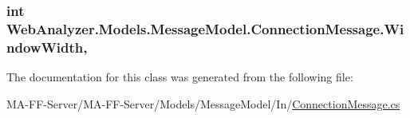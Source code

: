 \subsubsection[{Window\+Width}]{\setlength{\rightskip}{0pt plus 5cm}int Web\+Analyzer.\+Models.\+Message\+Model.\+Connection\+Message.\+Window\+Width\hspace{0.3cm}{\ttfamily [get]}, {\ttfamily [set]}}\label{class_web_analyzer_1_1_models_1_1_message_model_1_1_connection_message_ad41b2edd499a0085aefa4ab180de9dc7}


The documentation for this class was generated from the following file\+:\begin{DoxyCompactItemize}
\item 
M\+A-\/\+F\+F-\/\+Server/\+M\+A-\/\+F\+F-\/\+Server/\+Models/\+Message\+Model/\+In/\hyperlink{_connection_message_8cs}{Connection\+Message.\+cs}\end{DoxyCompactItemize}
